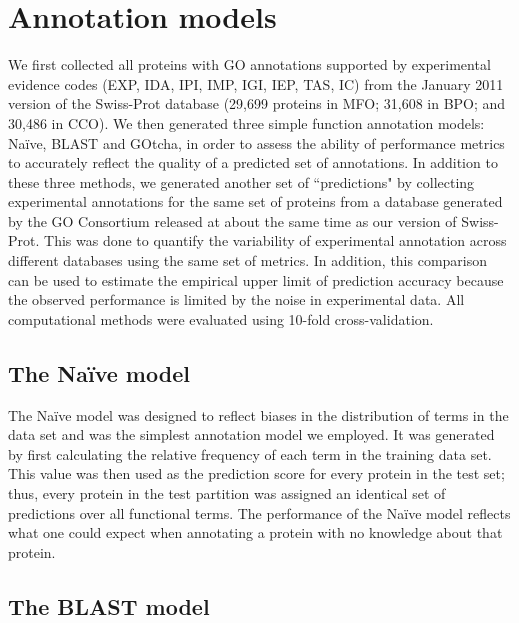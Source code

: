 \section{Annotation models}

We first collected all proteins with GO annotations supported by experimental evidence codes (EXP, IDA, IPI, IMP, IGI, IEP, TAS, IC) from the January 2011 version of the Swiss-Prot database (29,699 proteins in MFO; 31,608 in BPO; and 30,486 in CCO). We then generated three simple function annotation models: Na\"ive, BLAST and GOtcha, in order to assess the ability of performance metrics to accurately reflect the quality of a predicted set of annotations. In addition to these three methods, we generated another set of ``predictions" by collecting experimental annotations for the same set of proteins from a database generated by the GO Consortium released at about the same time as our version of Swiss-Prot. This was done to quantify the variability of experimental annotation across different databases using the same set of metrics. In addition, this comparison can be used to estimate the empirical upper limit of prediction accuracy because the observed performance is limited by the noise in experimental data. All computational methods were evaluated using 10-fold cross-validation. 

\subsection{The Na\"ive model}
\label{sec:naive}

The Na\"ive model was designed to reflect biases in the distribution of terms in the data set and was the simplest annotation model we employed. It was generated by first calculating the relative frequency of each term in the training data set. This value was then used as the prediction score for every protein in the test set; thus, every protein in the test partition was assigned an identical set of predictions over all functional terms. The performance of the Na\"ive model reflects what one could expect when annotating a protein with no knowledge about that protein.

\subsection{The BLAST model}
\label{sec:blast}


